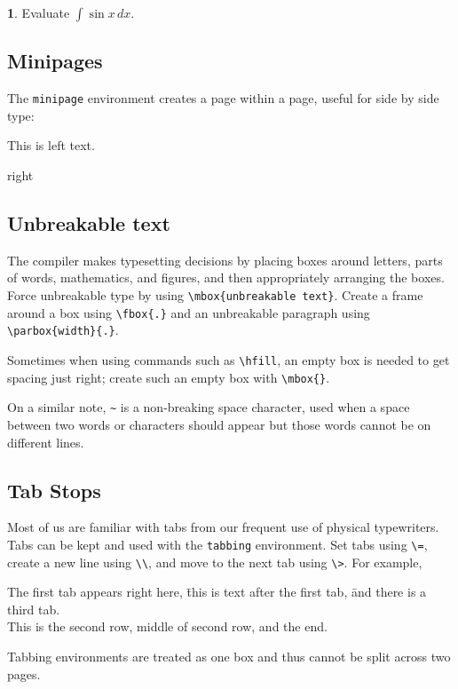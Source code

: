 \documentclass[11pt]{article}
\theoremstyle{definition}
\newtheorem{problem}{}
\begin{document}
\vfill

\begin{problem}
  Evaluate \(\displaystyle \int \sin x \, dx \).
\end{problem}

\vfill

\newpage

\subsection{Minipages}

The \verb~minipage~ environment creates a page within a page, useful for side
by side type:

\begin{center}
  \begin{minipage}{15eM}
    This is left text.
  \end{minipage}
  \begin{minipage}{15eM}
    right
  \end{minipage}
\end{center}

\subsection{Unbreakable text}

The compiler makes typesetting decisions by placing boxes around letters, parts of words,
mathematics, and figures, and then appropriately arranging the boxes.  Force unbreakable
type by using \verb~\mbox{unbreakable text}~.  Create a frame around a box using
\verb~\fbox{.}~ and an unbreakable paragraph using \verb~\parbox{width}{.}~.

Sometimes when using commands such as \verb~\hfill~, an empty box is needed to get spacing
just right; create such an empty box with \verb~\mbox{}~.

On a similar note, \verb!~! is a non-breaking space character, used when a space between
two words or characters should appear but those words cannot be on different lines.

\subsection{Tab Stops}

Most of us are familiar with tabs from our frequent use of physical typewriters.  Tabs can
be kept and used with the \verb~tabbing~ environment.  Set tabs using \verb~\=~, create a
new line using \verb~\\~, and move to the next tab using \verb~\>~.  For example,
\begin{tabbing}
  The first tab appears right here,
  \= this is text after the first tab,
  \= and there is a third tab.  \\
  This is the second row,
  \>  middle of second row,
  \> and the end.
\end{tabbing}
Tabbing environments are treated as one box and thus cannot be split across two pages.
\end{document}
